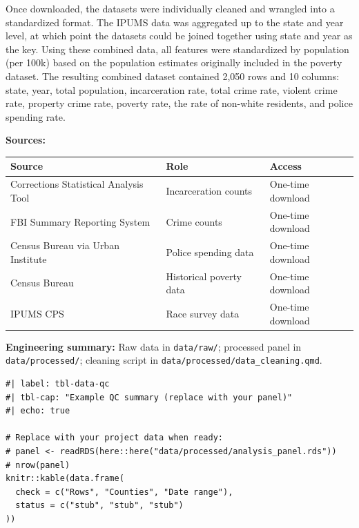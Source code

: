 \documentclass[
  letterpaper,
  DIV=11,
  numbers=noendperiod]{scrartcl}
\begin{document}
Once downloaded, the datasets were individually cleaned and wrangled
into a standardized format. The IPUMS data was aggregated up to the
state and year level, at which point the datasets could be joined
together using state and year as the key. Using these combined data, all
features were standardized by population (per 100k) based on the
population estimates originally included in the poverty dataset. The
resulting combined dataset contained 2,050 rows and 10 columns: state,
year, total population, incarceration rate, total crime rate, violent
crime rate, property crime rate, poverty rate, the rate of non-white
residents, and police spending rate.

\textbf{Sources:}

\begin{longtable}[]{@{}
  >{\raggedright\arraybackslash}p{}
  >{\raggedright\arraybackslash}p{}
  >{\raggedright\arraybackslash}p{}@{}}
\toprule\noalign{}
\begin{minipage}[b]{\linewidth}\raggedright
Source
\end{minipage} & \begin{minipage}[b]{\linewidth}\raggedright
Role
\end{minipage} & \begin{minipage}[b]{\linewidth}\raggedright
Access
\end{minipage} \\
\midrule\noalign{}
\endhead
\bottomrule\noalign{}
\endlastfoot
Corrections Statistical Analysis Tool & Incarceration counts & One-time
download \\
FBI Summary Reporting System & Crime counts & One-time download \\
Census Bureau via Urban Institute & Police spending data & One-time
download \\
Census Bureau & Historical poverty data & One-time download \\
IPUMS CPS & Race survey data & One-time download \\
\end{longtable}

\textbf{Engineering summary:} Raw data in \texttt{data/raw/}; processed
panel in \texttt{data/processed/}; cleaning script in
\texttt{data/processed/data\_cleaning.qmd}.

\begin{verbatim}
#| label: tbl-data-qc
#| tbl-cap: "Example QC summary (replace with your panel)"
#| echo: true

# Replace with your project data when ready:
# panel <- readRDS(here::here("data/processed/analysis_panel.rds"))
# nrow(panel)
knitr::kable(data.frame(
  check = c("Rows", "Counties", "Date range"),
  status = c("stub", "stub", "stub")
))
\end{verbatim}
\end{document}
